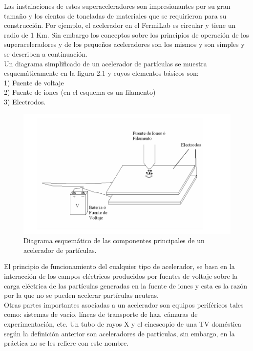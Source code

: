Las instalaciones de estos superaceleradores son impresionantes por su gran
tamaño y los cientos de toneladas de materiales que se requirieron para su
construcción. Por ejemplo, el acelerador en el FermiLab es circular y tiene un radio de 1 Km. Sin embargo los conceptos sobre los principios de operación de los
superaceleradores y de los pequeños aceleradores son los mismos y son simples y
se describen a continuación.\\

Un diagrama simplificado de un acelerador de partículas se muestra
esquemáticamente en la figura 2.1 y cuyos elementos básicos son:\\

1) Fuente de voltaje\\
2) Fuente de iones (en el esquema es un filamento)\\
3) Electrodos.

\begin{figure}[H]
\centering
\includegraphics[width=12cm]{capitulo2/figs/acelerador.png}
\caption{Diagrama esquemático de las componentes principales de un acelerador de
partículas.}
\end{figure}

El principio de funcionamiento del cualquier tipo de acelerador, se basa en la
interacción de los campos eléctricos producidos por fuentes de voltaje sobre la
carga eléctrica de las partículas generadas en la fuente de iones y esta es la razón por la que no se pueden acelerar partículas neutras.\\

Otras partes importantes asociadas a un acelerador son equipos periféricos
tales como: sistemas de vacío, líneas de transporte de haz, cámaras de
experimentación, etc. Un tubo de rayos X y el cinescopio de una TV doméstica según la definición
anterior son aceleradores de partículas, sin embargo, en la práctica no se les refiere con este nombre.\\


